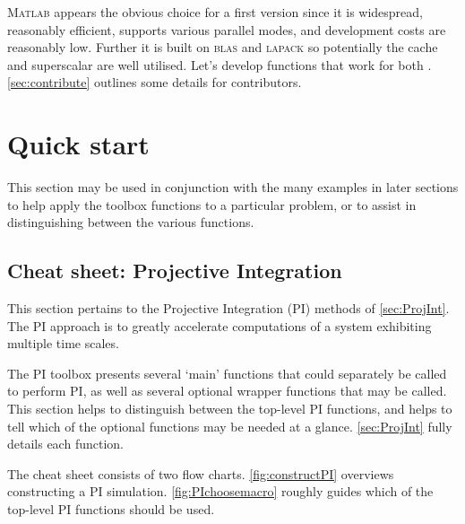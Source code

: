 \textsc{Matlab} appears the obvious choice for a first version since it is widespread, reasonably efficient, supports various parallel modes, and development costs are reasonably low.
Further it is built on \textsc{blas} and \textsc{lapack} so potentially the cache and superscalar \cpu{} are well utilised.
Let's develop functions that work for both \script.
\cref{sec:contribute} outlines some details for contributors.


\section{Quick start}
\localtableofcontents
This section may be used in conjunction with the many examples in later sections to help apply the toolbox functions to a particular problem, or to assist in distinguishing between the various functions.

\subsection{Cheat sheet: Projective Integration}
This section pertains to the Projective Integration (PI) methods of \cref{sec:ProjInt}. The PI approach is to greatly accelerate computations of a system exhibiting multiple time scales.

The PI toolbox presents several `main' functions that could separately be called to perform PI, as well as several optional wrapper functions that may be called. This section helps to distinguish between the top-level PI functions, and helps to tell which of the optional functions may be needed at a glance. \cref{sec:ProjInt} fully details each function.

The cheat sheet consists of two flow charts. \cref{fig:constructPI} overviews constructing a PI simulation. \cref{fig:PIchoosemacro} roughly guides which of the top-level PI functions should be used.

